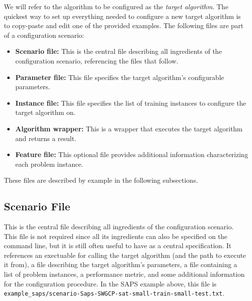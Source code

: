 \documentclass[11pt,letterpaper,twoside]{article}
\begin{document}
We will refer to the algorithm to be configured as the \emph{target algorithm}.
The quickest way to set up everything needed to configure a new target algorithm is to 
copy-paste and edit one of the provided examples. The following files are part of a configuration scenario:

\begin{itemize}
\denselist
	\item \textbf{Scenario file:} This is the central file describing all ingredients of the configuration scenario, referencing the files that follow. 
	
	\item \textbf{Parameter file:} This file specifies the target algorithm's configurable parameters.

	\item \textbf{Instance file:} This file specifies the list of training instances to configure the target algorithm on. 

	\item \textbf{Algorithm wrapper:} This is a wrapper that executes the target algorithm and returns a result.
	
	\item \textbf{Feature file:} This optional file provides additional information characterizing each problem instance.
\end{itemize}

\noindent{}These files are described by example in the following subsections.

\subsection{Scenario File}
This is the central file describing all ingredients of the configuration scenario.
This file is not required since all its ingredients can also be specified on the command line, but it is still often useful to have as a central specification. It references an exectuable for calling the target algorithm (and the path to execute it from), a file describing the target algorithm's parameters, a file containing a list of problem instances, a performance metric, and some additional information for the configuration procedure. In the SAPS example above, this file is \texttt{example\_saps/scenario-Saps-SWGCP-sat-small-train-small-test.txt}.

\end{document}
